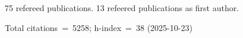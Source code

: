 75 refereed publications. 13 refeered publications as first author.

Total citations~=~5258; h-index~=~38 (2025-10-23)